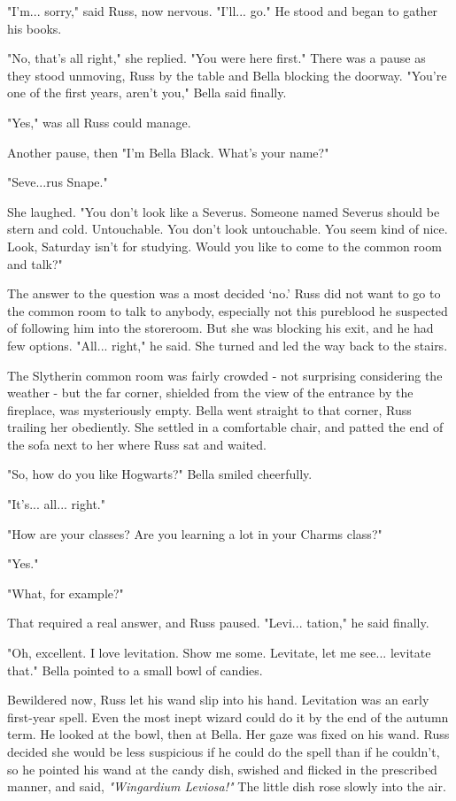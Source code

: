 \documentclass[a4paper,11pt]{article}
\begin{document}
"I'm... sorry," said Russ, now nervous. "I'll... go." He stood and began to gather his books.

"No, that's all right," she replied. "You were here first." There was a pause as they stood unmoving, Russ by the table and Bella blocking the doorway. "You're one of the first years, aren't you," Bella said finally.

"Yes," was all Russ could manage.

Another pause, then "I'm Bella Black. What's your name?"

"Seve...rus Snape."

She laughed. "You don't look like a Severus. Someone named Severus should be stern and cold. Untouchable. You don't look untouchable. You seem kind of nice. Look, Saturday isn't for studying. Would you like to come to the common room and talk?"

The answer to the question was a most decided `no.' Russ did not want to go to the common room to talk to anybody, especially not this pureblood he suspected of following him into the storeroom. But she was blocking his exit, and he had few options. "All... right," he said. She turned and led the way back to the stairs.

The Slytherin common room was fairly crowded - not surprising considering the weather - but the far corner, shielded from the view of the entrance by the fireplace, was mysteriously empty. Bella went straight to that corner, Russ trailing her obediently. She settled in a comfortable chair, and patted the end of the sofa next to her where Russ sat and waited.

"So, how do you like Hogwarts?" Bella smiled cheerfully.

"It's... all... right."

"How are your classes? Are you learning a lot in your Charms class?"

"Yes."

"What, for example?"

That required a real answer, and Russ paused. "Levi... tation," he said finally.

"Oh, excellent. I love levitation. Show me some. Levitate, let me see... levitate that." Bella pointed to a small bowl of candies.

Bewildered now, Russ let his wand slip into his hand. Levitation was an early first-year spell. Even the most inept wizard could do it by the end of the autumn term. He looked at the bowl, then at Bella. Her gaze was fixed on his wand. Russ decided she would be less suspicious if he could do the spell than if he couldn't, so he pointed his wand at the candy dish, swished and flicked in the prescribed manner, and said, \emph{"Wingardium Leviosa!"} The little dish rose slowly into the air.
\end{document}

